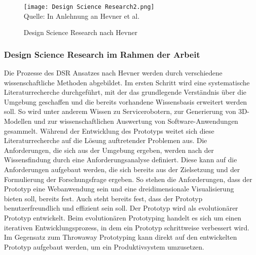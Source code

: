 \begin{figure}[H]
    \caption{Design Science Research nach Hevner}\label{fig:DesignScienceResearch}
    \texttt{[image: Design Science Research2.png]}
    \\
    Quelle: In Anlehnung an Hevner et al. \cite[S.~80]{Hevner2004}
\end{figure}

\subsubsection{Design Science Research im Rahmen der Arbeit}

Die Prozesse des \ac{DSR} Ansatzes nach Hevner werden durch verschiedene wissenschaftliche Methoden abgebildet. Im ersten Schritt wird eine systematische Literaturrecherche durchgeführt, mit der das grundlegende Verständnis über die Umgebung geschaffen und die bereits vorhandene Wissensbasis erweitert werden soll. So wird unter anderem Wissen zu Servicerobotern, zur Generierung von 3D-Modellen und zur wissenschaftlichen Auswertung von Software-Anwendungen gesammelt. Während der Entwicklung des Prototyps weitet sich diese Literaturrecherche auf die Lösung auftretender Problemen aus. Die Anforderungen, die sich aus der Umgebung ergeben, werden nach der Wissensfindung durch eine Anforderungsanalyse definiert. Diese kann auf die Anforderungen aufgebaut werden, die sich bereits aus der Zielsetzung und der Formulierung der Forschungsfrage ergeben. So stehen die Anforderungen, dass der Prototyp eine Webanwendung sein und eine dreidimensionale Visualisierung bieten soll, bereits fest. Auch steht bereits fest, dass der Prototyp benutzerfreundlich und effizient sein soll. Der Prototyp wird als evolutionärer Prototyp entwickelt. Beim evolutionären Prototyping handelt es sich um einen iterativen Entwicklungsprozess, in dem ein Prototyp schrittweise verbessert wird. Im Gegensatz zum Throwaway Prototyping kann direkt auf den entwickelten Prototyp aufgebaut werden, um ein Produktivsystem umzusetzen.\cite[S.~17-18]{Crinnion1992}
